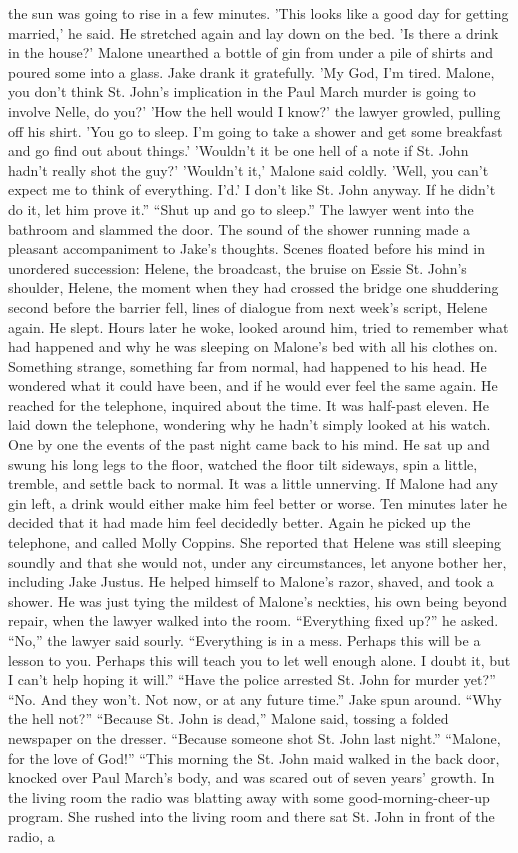 \documentclass{novel}
\begin{document}
the sun was going to rise in a few minutes. 'This looks like a good day for getting married,' he said. He stretched again and lay down on the bed. 'Is there a drink in the house?' Malone unearthed a bottle of gin from under a pile of shirts and poured some into a glass. Jake drank it gratefully. 'My God, I’m tired. Malone, you don’t think St. John’s implication in the Paul March murder is going to involve Nelle, do you?' 'How the hell would I know?' the lawyer growled, pulling off his shirt. 'You go to sleep. I’m going to take a shower and get some breakfast and go find out about things.' 'Wouldn’t it be one hell of a note if St. John hadn’t really shot the guy?' 'Wouldn’t it,' Malone said coldly. 'Well, you can’t expect me to think of everything. I'd.' I don’t like St. John anyway. If he didn’t do it, let him prove it.” “Shut up and go to sleep.” The lawyer went into the bathroom and slammed the door. The sound of the shower running made a pleasant accompaniment to Jake’s thoughts. Scenes floated before his mind in unordered succession: Helene, the broadcast, the bruise on Essie St. John’s shoulder, Helene, the moment when they had crossed the bridge one shuddering second before the barrier fell, lines of dialogue from next week’s script, Helene again. He slept. Hours later he woke, looked around him, tried to remember what had happened and why he was sleeping on Malone’s bed with all his clothes on. Something strange, something far from normal, had happened to his head. He wondered what it could have been, and if he would ever feel the same again. He reached for the telephone, inquired about the time. It was half-past eleven. He laid down the telephone, wondering why he hadn’t simply looked at his watch. One by one the events of the past night came back to his mind. He sat up and swung his long legs to the floor, watched the floor tilt sideways, spin a little, tremble, and settle back to normal. It was a little unnerving. If Malone had any gin left, a drink would either make him feel better or worse. Ten minutes later he decided that it had made him feel decidedly better. Again he picked up the telephone, and called Molly Coppins. She reported that Helene was still sleeping soundly and that she would not, under any circumstances, let anyone bother her, including Jake Justus. He helped himself to Malone’s razor, shaved, and took a shower. He was just tying the mildest of Malone’s neckties, his own being beyond repair, when the lawyer walked into the room. “Everything fixed up?” he asked. “No,” the lawyer said sourly. “Everything is in a mess. Perhaps this will be a lesson to you. Perhaps this will teach you to let well enough alone. I doubt it, but I can’t help hoping it will.” “Have the police arrested St. John for murder yet?” “No. And they won’t. Not now, or at any future time.” Jake spun around. “Why the hell not?” “Because St. John is dead,” Malone said, tossing a folded newspaper on the dresser. “Because someone shot St. John last night.” “Malone, for the love of God!” “This morning the St. John maid walked in the back door, knocked over Paul March’s body, and was scared out of seven years’ growth. In the living room the radio was blatting away with some good-morning-cheer-up program. She rushed into the living room and there sat St. John in front of the radio, a 
\end{document}
